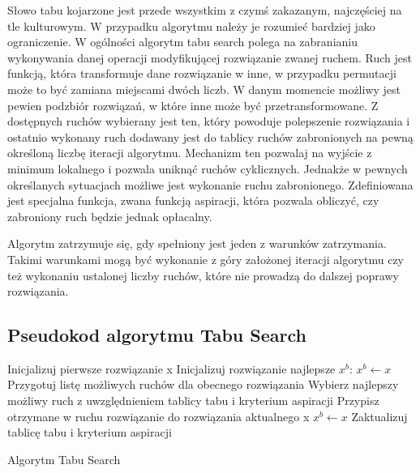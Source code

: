 Słowo tabu kojarzone jest przede wszystkim z czymś zakazanym, najczęściej na tle kulturowym. W przypadku algorytmu należy je rozumieć bardziej jako ograniczenie. W ogólności algorytm tabu search polega na zabranianiu wykonywania danej operacji modyfikującej rozwiązanie zwanej ruchem. Ruch jest funkcją, która transformuje dane rozwiązanie w inne, w przypadku permutacji może to być zamiana miejscami dwóch liczb. W danym momencie możliwy jest pewien podzbiór rozwiązań, w które inne może być przetransformowane. Z dostępnych ruchów wybierany jest ten, który powoduje polepszenie rozwiązania i ostatnio wykonany ruch dodawany jest do tablicy ruchów zabronionych na pewną określoną liczbę iteracji algorytmu. Mechanizm ten pozwalaj na wyjście z minimum lokalnego i pozwala uniknąć ruchów cyklicznych. Jednakże w pewnych określanych sytuacjach możliwe jest wykonanie ruchu zabronionego. Zdefiniowana jest specjalna funkcja, zwana funkcją aspiracji, która pozwala obliczyć, czy zabroniony ruch będzie jednak opłacalny.

Algorytm zatrzymuje się, gdy spełniony jest jeden z warunków zatrzymania. Takimi warunkami mogą być wykonanie z góry założonej iteracji algorytmu czy też wykonaniu ustalonej liczby ruchów, które nie prowadzą do dalszej poprawy rozwiązania.

\subsection{Pseudokod algorytmu Tabu Search}
\begin{algorithm}[H]
	Inicjalizuj pierwsze rozwiązanie x\;
	Inicjalizuj rozwiązanie najlepsze $x^b$: $x^b \leftarrow x$\;
 	{
 		Przygotuj listę możliwych ruchów dla obecnego rozwiązania\;
 		Wybierz najlepszy możliwy ruch z uwzględnieniem tablicy tabu i kryterium aspiracji\;
 		Przypisz otrzymane w ruchu rozwiązanie do rozwiązania aktualnego x\;
 		{
 			$x^b \leftarrow x$
 		} 		
 		Zaktualizuj tablicę tabu i kryterium aspiracji\;		
 	}
 	\caption{Algorytm Tabu Search}
\end{algorithm}

